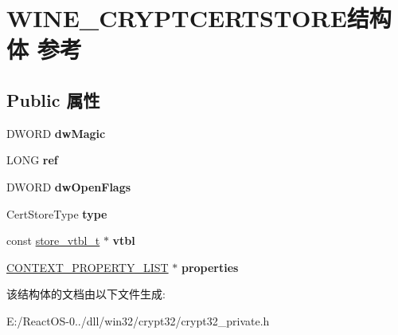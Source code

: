\hypertarget{struct_w_i_n_e___c_r_y_p_t_c_e_r_t_s_t_o_r_e}{}\section{W\+I\+N\+E\+\_\+\+C\+R\+Y\+P\+T\+C\+E\+R\+T\+S\+T\+O\+R\+E结构体 参考}
\label{struct_w_i_n_e___c_r_y_p_t_c_e_r_t_s_t_o_r_e}
\subsection*{Public 属性}
\begin{DoxyCompactItemize}
\item 
\mbox{\label{struct_w_i_n_e___c_r_y_p_t_c_e_r_t_s_t_o_r_e_af0244fee093f187e3b16e6cecdc7dfd7}} 
D\+W\+O\+RD {\bfseries dw\+Magic}
\item 
\mbox{\label{struct_w_i_n_e___c_r_y_p_t_c_e_r_t_s_t_o_r_e_ac273aec360bc3220c9ef67fb2ea30b96}} 
L\+O\+NG {\bfseries ref}
\item 
\mbox{\label{struct_w_i_n_e___c_r_y_p_t_c_e_r_t_s_t_o_r_e_a1e89a832c838fbba52d8fa2bd5af3a75}} 
D\+W\+O\+RD {\bfseries dw\+Open\+Flags}
\item 
\mbox{\label{struct_w_i_n_e___c_r_y_p_t_c_e_r_t_s_t_o_r_e_a9606cdce74ada36293288d80dc805633}} 
Cert\+Store\+Type {\bfseries type}
\item 
\mbox{\label{struct_w_i_n_e___c_r_y_p_t_c_e_r_t_s_t_o_r_e_a7e93fa9c992d63148dd5734041326907}} 
const \hyperlink{structstore__vtbl__t}{store\+\_\+vtbl\+\_\+t} $\ast$ {\bfseries vtbl}
\item 
\mbox{\label{struct_w_i_n_e___c_r_y_p_t_c_e_r_t_s_t_o_r_e_ad593f57bf6c410a6cfbaf4fe2a9eb152}} 
\hyperlink{struct___c_o_n_t_e_x_t___p_r_o_p_e_r_t_y___l_i_s_t}{C\+O\+N\+T\+E\+X\+T\+\_\+\+P\+R\+O\+P\+E\+R\+T\+Y\+\_\+\+L\+I\+ST} $\ast$ {\bfseries properties}
\end{DoxyCompactItemize}


该结构体的文档由以下文件生成\+:\begin{DoxyCompactItemize}
\item 
E\+:/\+React\+O\+S-\/0../dll/win32/crypt32/crypt32\+\_\+private.\+h\end{DoxyCompactItemize}
